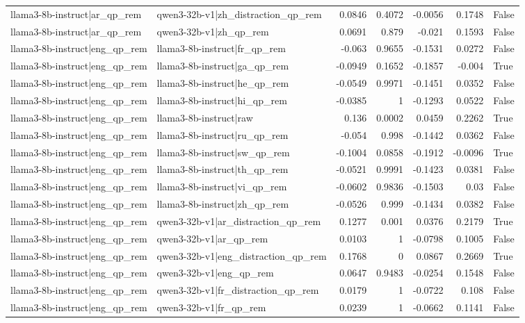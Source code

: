 \begin{table}
\begin{tabular}{l l r r r r l}
llama3-8b-instruct|ar_qp_rem & qwen3-32b-v1|zh_distraction_qp_rem & 0.0846 & 0.4072 & -0.0056 & 0.1748 & False \\
llama3-8b-instruct|ar_qp_rem & qwen3-32b-v1|zh_qp_rem & 0.0691 & 0.879 & -0.021 & 0.1593 & False \\
llama3-8b-instruct|eng_qp_rem & llama3-8b-instruct|fr_qp_rem & -0.063 & 0.9655 & -0.1531 & 0.0272 & False \\
llama3-8b-instruct|eng_qp_rem & llama3-8b-instruct|ga_qp_rem & -0.0949 & 0.1652 & -0.1857 & -0.004 & True \\
llama3-8b-instruct|eng_qp_rem & llama3-8b-instruct|he_qp_rem & -0.0549 & 0.9971 & -0.1451 & 0.0352 & False \\
llama3-8b-instruct|eng_qp_rem & llama3-8b-instruct|hi_qp_rem & -0.0385 & 1 & -0.1293 & 0.0522 & False \\
llama3-8b-instruct|eng_qp_rem & llama3-8b-instruct|raw & 0.136 & 0.0002 & 0.0459 & 0.2262 & True \\
llama3-8b-instruct|eng_qp_rem & llama3-8b-instruct|ru_qp_rem & -0.054 & 0.998 & -0.1442 & 0.0362 & False \\
llama3-8b-instruct|eng_qp_rem & llama3-8b-instruct|sw_qp_rem & -0.1004 & 0.0858 & -0.1912 & -0.0096 & True \\
llama3-8b-instruct|eng_qp_rem & llama3-8b-instruct|th_qp_rem & -0.0521 & 0.9991 & -0.1423 & 0.0381 & False \\
llama3-8b-instruct|eng_qp_rem & llama3-8b-instruct|vi_qp_rem & -0.0602 & 0.9836 & -0.1503 & 0.03 & False \\
llama3-8b-instruct|eng_qp_rem & llama3-8b-instruct|zh_qp_rem & -0.0526 & 0.999 & -0.1434 & 0.0382 & False \\
llama3-8b-instruct|eng_qp_rem & qwen3-32b-v1|ar_distraction_qp_rem & 0.1277 & 0.001 & 0.0376 & 0.2179 & True \\
llama3-8b-instruct|eng_qp_rem & qwen3-32b-v1|ar_qp_rem & 0.0103 & 1 & -0.0798 & 0.1005 & False \\
llama3-8b-instruct|eng_qp_rem & qwen3-32b-v1|eng_distraction_qp_rem & 0.1768 & 0 & 0.0867 & 0.2669 & True \\
llama3-8b-instruct|eng_qp_rem & qwen3-32b-v1|eng_qp_rem & 0.0647 & 0.9483 & -0.0254 & 0.1548 & False \\
llama3-8b-instruct|eng_qp_rem & qwen3-32b-v1|fr_distraction_qp_rem & 0.0179 & 1 & -0.0722 & 0.108 & False \\
llama3-8b-instruct|eng_qp_rem & qwen3-32b-v1|fr_qp_rem & 0.0239 & 1 & -0.0662 & 0.1141 & False \\

\end{tabular}
\end{table}
